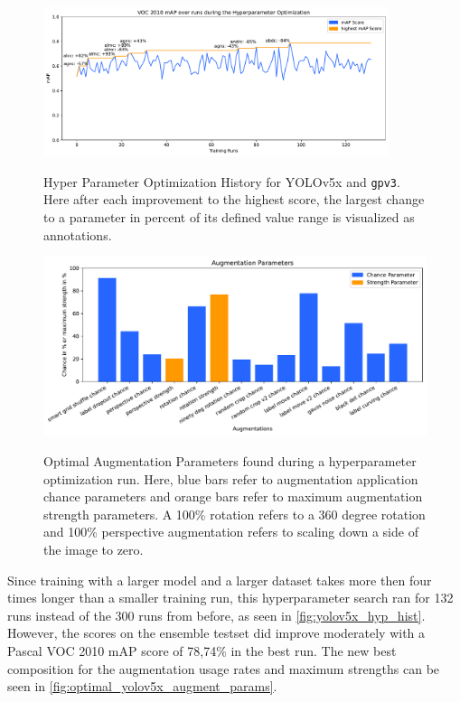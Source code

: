 \documentclass[10pt]{book}
\newcommand{\figureref}[1]{\autoref{#1}}
\begin{document}
\begin{figure}
  \caption{Hyper Parameter Optimization History for \ac{YOLO}v5x and \texttt{gpv3}. Here after each improvement to the highest score, the largest change to a parameter in percent of its defined value range is visualized as annotations.}
  \includegraphics[width=0.9\textwidth]{image/hyp-param-search-yolov5x_gpv3_hyp_test-history}
  \label{fig:yolov5x_hyp_hist}
\end{figure}

\begin{figure}
  \caption{Optimal Augmentation Parameters found during a hyperparameter optimization run. Here, blue bars
  refer to augmentation application chance parameters and orange bars refer to maximum augmentation strength
  parameters. A 100\% rotation refers to a 360 degree rotation and 100\% perspective augmentation refers to scaling
  down a side of the image to zero.}
  \includegraphics[width=\textwidth]{plot/best_yolov5x_hyp_run_params}
  \label{fig:optimal_yolov5x_augment_params} 
\end{figure}

Since training with a larger model and a larger dataset takes more then four times longer than a smaller training run, this hyperparameter search ran for 132 runs instead of the 300 runs from before, as seen in \figureref{fig:yolov5x_hyp_hist}. However, the scores on the ensemble testset did improve moderately with a Pascal VOC 2010 mAP score of 78,74\% in the best run. The new best composition for the augmentation usage rates and maximum strengths can be seen in \figureref{fig:optimal_yolov5x_augment_params}.
\end{document}
